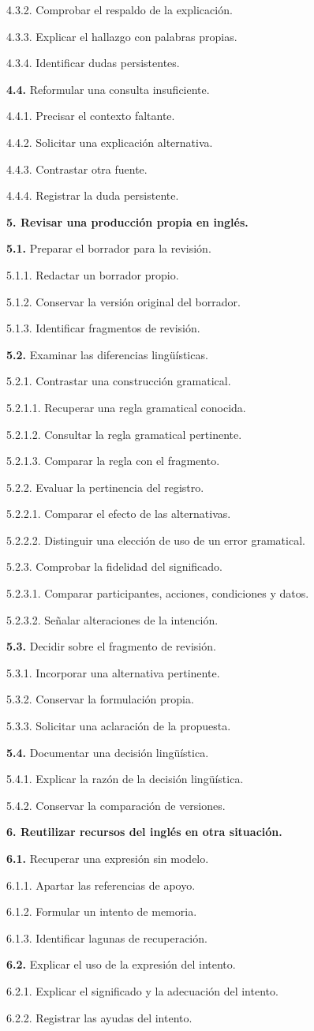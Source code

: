 \documentclass[10pt,a4paper]{article}
\newcommand{\HTAline}[3]{\par\noindent\hspace*{#1cm}\begin{minipage}{\dimexpr\linewidth-#1cm\relax}#3 #2\end{minipage}\par}
\begin{document}
\HTAline{0.8}{4.3.2. Comprobar el respaldo de la explicación.}{}
\HTAline{0.8}{4.3.3. Explicar el hallazgo con palabras propias.}{}
\HTAline{0.8}{4.3.4. Identificar dudas persistentes.}{}
\HTAline{0.4}{\textbf{4.4.} Reformular una consulta insuficiente.}{}
\HTAline{0.8}{4.4.1. Precisar el contexto faltante.}{}
\HTAline{0.8}{4.4.2. Solicitar una explicación alternativa.}{}
\HTAline{0.8}{4.4.3. Contrastar otra fuente.}{}
\HTAline{0.8}{4.4.4. Registrar la duda persistente.}{}
\HTAline{0.0}{\textbf{5. Revisar una producción propia en inglés.}}{}
\HTAline{0.4}{\textbf{5.1.} Preparar el borrador para la revisión.}{}
\HTAline{0.8}{5.1.1. Redactar un borrador propio.}{}
\HTAline{0.8}{5.1.2. Conservar la versión original del borrador.}{}
\HTAline{0.8}{5.1.3. Identificar fragmentos de revisión.}{}
\HTAline{0.4}{\textbf{5.2.} Examinar las diferencias lingüísticas.}{}
\HTAline{0.8}{5.2.1. Contrastar una construcción gramatical.}{}
\HTAline{1.2000000000000002}{5.2.1.1. Recuperar una regla gramatical conocida.}{}
\HTAline{1.2000000000000002}{5.2.1.2. Consultar la regla gramatical pertinente.}{}
\HTAline{1.2000000000000002}{5.2.1.3. Comparar la regla con el fragmento.}{}
\HTAline{0.8}{5.2.2. Evaluar la pertinencia del registro.}{}
\HTAline{1.2000000000000002}{5.2.2.1. Comparar el efecto de las alternativas.}{}
\HTAline{1.2000000000000002}{5.2.2.2. Distinguir una elección de uso de un error gramatical.}{}
\HTAline{0.8}{5.2.3. Comprobar la fidelidad del significado.}{}
\HTAline{1.2000000000000002}{5.2.3.1. Comparar participantes, acciones, condiciones y datos.}{}
\HTAline{1.2000000000000002}{5.2.3.2. Señalar alteraciones de la intención.}{}
\HTAline{0.4}{\textbf{5.3.} Decidir sobre el fragmento de revisión.}{}
\HTAline{0.8}{5.3.1. Incorporar una alternativa pertinente.}{}
\HTAline{0.8}{5.3.2. Conservar la formulación propia.}{}
\HTAline{0.8}{5.3.3. Solicitar una aclaración de la propuesta.}{}
\HTAline{0.4}{\textbf{5.4.} Documentar una decisión lingüística.}{}
\HTAline{0.8}{5.4.1. Explicar la razón de la decisión lingüística.}{}
\HTAline{0.8}{5.4.2. Conservar la comparación de versiones.}{}
\HTAline{0.0}{\textbf{6. Reutilizar recursos del inglés en otra situación.}}{}
\HTAline{0.4}{\textbf{6.1.} Recuperar una expresión sin modelo.}{}
\HTAline{0.8}{6.1.1. Apartar las referencias de apoyo.}{}
\HTAline{0.8}{6.1.2. Formular un intento de memoria.}{}
\HTAline{0.8}{6.1.3. Identificar lagunas de recuperación.}{}
\HTAline{0.4}{\textbf{6.2.} Explicar el uso de la expresión del intento.}{}
\HTAline{0.8}{6.2.1. Explicar el significado y la adecuación del intento.}{}
\HTAline{0.8}{6.2.2. Registrar las ayudas del intento.}{}
\end{document}
